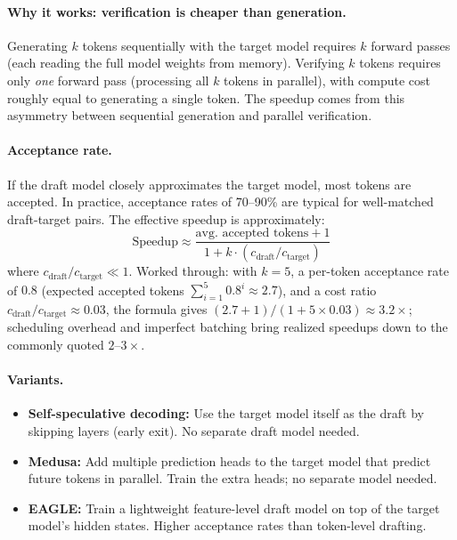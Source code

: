 \paragraph{Why it works: verification is cheaper than generation.}
Generating $k$ tokens sequentially with the target model requires $k$ forward passes
(each reading the full model weights from memory).  Verifying $k$ tokens requires only
\emph{one} forward pass (processing all $k$ tokens in parallel), with compute cost
roughly equal to generating a single token.  The speedup comes from this asymmetry
between sequential generation and parallel verification.

\paragraph{Acceptance rate.}
If the draft model closely approximates the target model, most tokens are accepted.
In practice, acceptance rates of 70--90\% are typical for well-matched draft-target
pairs.  The effective speedup is approximately:
\[
    \text{Speedup} \approx \frac{\text{avg.\ accepted tokens} + 1}{1 + k \cdot (c_{\text{draft}} / c_{\text{target}})}
\]
where $c_{\text{draft}} / c_{\text{target}} \ll 1$.  Worked through: with $k = 5$, a
per-token acceptance rate of $0.8$ (expected accepted tokens
$\sum_{i=1}^{5} 0.8^i \approx 2.7$), and a cost ratio
$c_{\text{draft}}/c_{\text{target}} \approx 0.03$, the formula gives
$(2.7 + 1)/(1 + 5 \times 0.03) \approx 3.2\times$; scheduling overhead and imperfect
batching bring realized speedups down to the commonly quoted $2$--$3\times$.

\paragraph{Variants.}
\begin{itemize}
    \item \textbf{Self-speculative decoding:} Use the target model itself as the draft
          by skipping layers (early exit).  No separate draft model needed.
    \item \textbf{Medusa:} Add multiple prediction heads to the target model that predict
          future tokens in parallel.  Train the extra heads; no separate model needed.
    \item \textbf{EAGLE:} Train a lightweight feature-level draft model on top of the
          target model's hidden states.  Higher acceptance rates than token-level drafting.
\end{itemize}


